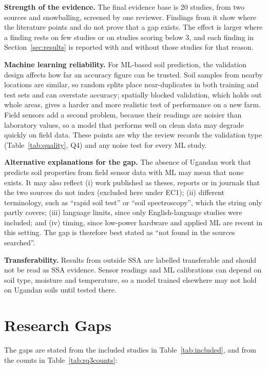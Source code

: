 \documentclass[conference]{IEEEtran}
\begin{document}
\noindent\textbf{Strength of the evidence.} The final evidence base is 20 studies,
from two sources and snowballing, screened by one reviewer. Findings from it show
where the literature points and do not prove that a gap exists. The effect is
larger where a finding rests on few studies or on studies scoring below 3, and
each finding in Section~\ref{sec:results} is reported with and without those
studies for that reason.

\noindent\textbf{Machine learning reliability.} For ML-based soil prediction, the
validation design affects how far an accuracy figure can be trusted. Soil samples
from nearby locations are similar, so random splits place near-duplicates in both
training and test sets and can overstate accuracy; spatially blocked validation,
which holds out whole areas, gives a harder and more realistic test of
performance on a new farm. Field sensors add a second problem, because their
readings are noisier than laboratory values, so a model that performs well on
clean data may degrade quickly on field data. These points are why the review
records the validation type (Table~\ref{tab:quality}, Q4) and any noise test for
every ML study.

\noindent\textbf{Alternative explanations for the gap.} The absence of Ugandan
work that predicts soil properties from field sensor data with ML may mean that
none exists. It may also reflect (i) work published as theses, reports or in
journals that the two sources do not index (excluded here under EC1); (ii)
different terminology, such as ``rapid soil test'' or ``soil spectroscopy'',
which the string only partly covers; (iii) language limits, since only
English-language studies were included; and (iv) timing, since low-power hardware
and applied ML are recent in this setting. The gap is therefore best stated as
``not found in the sources searched''.

\noindent\textbf{Transferability.} Results from outside SSA are labelled
transferable and should not be read as SSA evidence. Sensor readings and ML
calibrations can depend on soil type, moisture and temperature, so a model trained
elsewhere may not hold on Ugandan soils until tested there.

\section{Research Gaps}\label{sec:gaps}
The gaps are stated from the included studies in Table~\ref{tab:included}, and
from the counts in Table~\ref{tab:rq3counts}:
\end{document}

